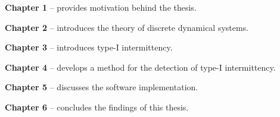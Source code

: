 \begin{description}
	\item \textbf{Chapter 1} -- provides motivation behind the thesis.
	\item \textbf{Chapter 2} -- introduces the theory of discrete dynamical systems.
	\item \textbf{Chapter 3} -- introduces type-I intermittency.
	\item \textbf{Chapter 4} -- develops a method for the detection of type-I intermittency.
	\item \textbf{Chapter 5} -- discusses the software implementation.
	\item \textbf{Chapter 6} -- concludes the findings of this thesis.
\end{description}

\endinput
